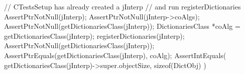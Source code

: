 
\startCTest
  // CTestsSetup has already created a jInterp
  // and run registerDictionaries
  AssertPtrNotNull(jInterp);
  AssertPtrNotNull(jInterp->coAlgs);
  AssertPtrNotNull(getDictionariesClass(jInterp));
  DictionariesClass *coAlg = getDictionariesClass(jInterp);
  registerDictionaries(jInterp);
  AssertPtrNotNull(getDictionariesClass(jInterp));
  AssertPtrEquals(getDictionariesClass(jInterp), coAlg);
  AssertIntEquals(
    getDictionariesClass(jInterp)->super.objectSize,
    sizeof(DictObj)
  )
\stopCTest
\stopTestCase
\stopTestSuite

